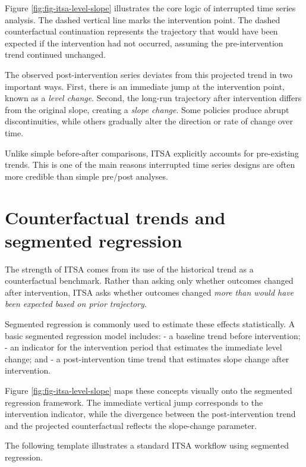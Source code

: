 \documentclass[
  11pt,
  oneside]{book}
\begin{document}
Figure \ref{fig:fig-itsa-level-slope} illustrates the core logic of interrupted time series analysis. The dashed vertical line marks the intervention point. The dashed counterfactual continuation represents the trajectory that would have been expected if the intervention had not occurred, assuming the pre-intervention trend continued unchanged.

The observed post-intervention series deviates from this projected trend in two important ways. First, there is an immediate jump at the intervention point, known as a \emph{level change}. Second, the long-run trajectory after intervention differs from the original slope, creating a \emph{slope change}. Some policies produce abrupt discontinuities, while others gradually alter the direction or rate of change over time.

Unlike simple before-after comparisons, ITSA explicitly accounts for pre-existing trends. This is one of the main reasons interrupted time series designs are often more credible than simple pre/post analyses.

\section{Counterfactual trends and segmented regression}\label{counterfactual-trends-and-segmented-regression}

The strength of ITSA comes from its use of the historical trend as a counterfactual benchmark. Rather than asking only whether outcomes changed after intervention, ITSA asks whether outcomes changed \emph{more than would have been expected based on prior trajectory}.

Segmented regression is commonly used to estimate these effects statistically. A basic segmented regression model includes:
- a baseline trend before intervention;
- an indicator for the intervention period that estimates the immediate level change; and
- a post-intervention time trend that estimates slope change after intervention.

Figure \ref{fig:fig-itsa-level-slope} maps these concepts visually onto the segmented regression framework. The immediate vertical jump corresponds to the intervention indicator, while the divergence between the post-intervention trend and the projected counterfactual reflects the slope-change parameter.

The following template illustrates a standard ITSA workflow using segmented regression.
\end{document}

